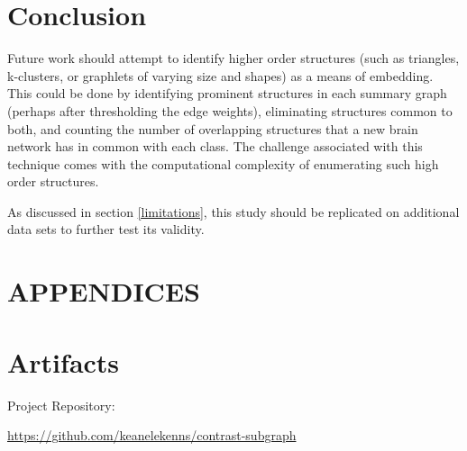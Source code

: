 \documentclass[sigconf]{acmart}
\begin{document}
\section{Conclusion} \label{conclusion}

Future work should attempt to identify higher order structures (such as triangles, k-clusters, or graphlets of varying size and shapes) as a means of embedding.
This could be done by identifying prominent structures in each summary graph (perhaps after thresholding the edge weights), eliminating structures common to both, and counting the number of overlapping structures that a new brain network has in common with each class.
The challenge associated with this technique comes with the computational complexity of enumerating such high order structures.

As discussed in section \ref{limitations}, this study should be replicated on additional data sets to further test its validity.




\appendix
\section*{APPENDICES}
\section{Artifacts} \label{artifacts}

Project Repository:

\url{https://github.com/keanelekenns/contrast-subgraph}
\end{document}
